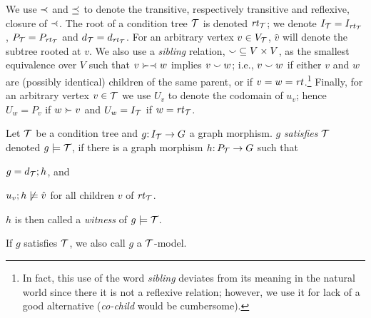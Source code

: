 We use $\prec$ and $\preceq$ to denote the transitive, respectively transitive and reflexive, closure of $\parentof$. The root of a condition tree ${\mathcal{T}}$ is denoted $\mathit{rt}_{{\mathcal{T}}}$; we denote $I_{\mathcal{T}}=I_{\mathit{rt}_{{\mathcal{T}}}}$, $P_{\mathcal{T}}=P_{\mathit{rt}_{{\mathcal{T}}}}$ and $d_{\mathcal{T}}=d_{\mathit{rt}_{{\mathcal{T}}}}$. For an arbitrary vertex $v\in V_{\mathcal{T}}$, $\hat v$ will denote the subtree rooted at $v$. We also use a \emph{sibling} relation, ${\smallsmile}\subseteq V\times V$, as the smallest equivalence over $V$ such that $v\childof\parentof w$ implies $v\smallsmile w$; i.e., $v\smallsmile w$ if either $v$ and $w$ are (possibly identical) children of the same parent, or if $v=w=\mathit{rt}$.\footnote{In fact, this use of the word \emph{sibling} deviates from its meaning in the natural world since there it is not a reflexive relation; however, we use it for lack of a good alternative (\emph{co-child} would be cumbersome).} Finally, for an arbitrary vertex $v\in {\mathcal{T}}$ we use $U_v$ to denote the codomain of $u_v$; hence $U_w=P_v$ if $w\childof v$ and $U_w=I_{\mathcal{T}}$ if $w=\mathit{rt}_{{\mathcal{T}}}$.

\begin{definition}[satisfaction]\label{def:satisfaction}
Let ${\mathcal{T}}$ be a condition tree and $g{:}\, I_{\mathcal{T}}\rightarrow G$ a graph morphism. $g$ \emph{satisfies ${\mathcal{T}}$} denoted $g\models {\mathcal{T}}$, if there is a graph morphism $h{:}\, P_{\mathcal{T}}\rightarrow G$ such that
\begin{inumerate}
\item $g=d_{\mathcal{T}};h$, and 
\item $u_v;h\not\models \hat v$ for all children $v$ of $\mathit{rt}_{{\mathcal{T}}}$.
\end{inumerate}
$h$ is then called a \emph{witness} of $g\models {\mathcal{T}}$.
\end{definition}
%
If $g$ satisfies ${\mathcal{T}}$, we also call $g$ a ${\mathcal{T}}$-model.


